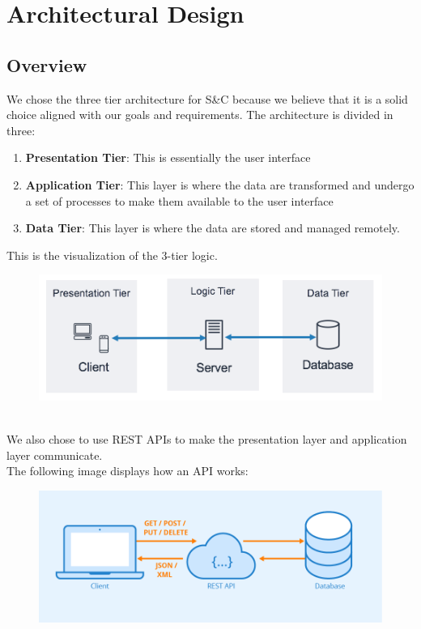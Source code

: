\section{Architectural Design}
\subsection{Overview}
We chose the three tier architecture for S\&C because we believe that it is a solid choice aligned with our goals and requirements.
The architecture is divided in three:
\begin{enumerate}
    \item\textbf{Presentation Tier}:
    This is essentially the user interface
    \item\textbf{Application Tier}:
    This layer is where the data are transformed and undergo a set of processes to make them available to the user interface
    \item\textbf{Data Tier}:
    This layer is where the data are stored and managed remotely.
\end{enumerate}
This is the visualization of the 3-tier logic. \cite{3Tier}\\
\begin{figure}[h!]
        \centering  \includegraphics[width=1\textwidth]{DD/Images/aws.png}
        \label{fig:3Tier}
\end{figure}
\\
We also chose to use REST APIs to make the presentation layer and application layer communicate.  \\
The following image displays how an API works\cite{REST}:
\begin{figure}[h!]
        \centering  \includegraphics[width=1\textwidth]{DD/Images/rest.png}
        \label{fig:RESTAPI}
\end{figure}
\newpage
